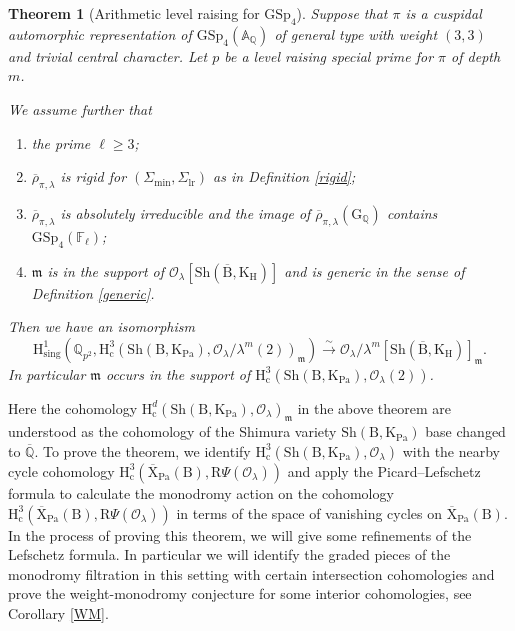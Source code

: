 \documentclass[10pt]{amsart}
\numberwithin{equation}{section}
\newtheorem{theorem}[equation]{Theorem}
\theoremstyle{definition}
\def\GSp{\mathrm{GSp}}
\def\min{\mathrm{min}}
\def\lr{\mathrm{lr}}
\def\Pa{\mathrm{Pa}}
\def\sing{\mathrm{sing}}
\def\calO{\mathcal{O}}
\def\fracm{\mathfrak{m}}
\def\FF{\mathbb{F}}
\def\QQ{\mathbb{Q}}
\def\rmc{\mathrm{c}}
\def\rmB{\mathrm{B}}
\def\rmG{\mathrm{G}}
\def\rmH{\mathrm{H}}
\def\rmK{\mathrm{K}}
\def\rmR{\mathrm{R}}
\def\rmX{\mathrm{X}}
\def\Sh{\mathrm{Sh}}
\begin{document}
\begin{theorem}[Arithmetic level raising for $\GSp_{4}$]\label{intro-main}
Suppose that $\pi$ is a cuspidal automorphic representation of $\GSp_{4}(\mathbb{A}_{\QQ})$ of general type with weight $(3,3)$ and trivial central character. 
Let $p$ be a level raising special prime for $\pi$ of depth $m$. 

We assume further that
\begin{enumerate}
\item the prime $\ell\geq 3$;
\item $\overline{\rho}_{\pi,\lambda}$ is rigid for $(\Sigma_{\min}, \Sigma_{\lr})$ as in Definition \ref{rigid};
\item $\overline{\rho}_{\pi,\lambda}$ is absolutely irreducible and the image of $\overline{\rho}_{\pi,\lambda}(\rmG_{\QQ})$ contains $\GSp_{4}(\FF_{\ell})$;
\item $\fracm$ is in the support of $\calO_{\lambda}[\Sh(\overline{\rmB}, \rmK_{\rmH})]$ and is generic in the sense of Definition \ref{generic}.
\end{enumerate}
Then we have an isomorphism
\begin{equation*}
\rmH^{1}_{\sing}(\QQ_{p^{2}}, \rmH^{3}_{\rmc}(\Sh(\rmB, \rmK_{\Pa}), \calO_{\lambda}/\lambda^{m}(2))_{\fracm})\xrightarrow{\sim}\calO_{\lambda}/\lambda^{m}[\Sh(\overline{\rmB}, \rmK_{\rmH})]_{\fracm}.
\end{equation*}
In particular $\fracm$ occurs in the support of $\rmH^{3}_{\rmc}(\Sh(\rmB, \rmK_{\Pa}), \calO_{\lambda}(2))$. 
\end{theorem}
Here the cohomology $\rmH^{d}_{\rmc}(\Sh(\rmB, \rmK_{\Pa}), \calO_{\lambda})_{\fracm}$ in the above theorem are understood as the cohomology of the Shimura variety $\Sh(\rmB, \rmK_{\Pa})$ base changed to $\overline{\QQ}$.  To prove the theorem, we identify $\rmH^{3}_{\rmc}(\Sh(\rmB, \rmK_{\Pa}), \calO_{\lambda})$ with the nearby cycle cohomology $\rmH^{3}_{\rmc}(\overline{\rmX}_{\Pa}(\rmB), \rmR\Psi(\calO_{\lambda}))$  and apply the Picard--Lefschetz formula to calculate the monodromy action on the cohomology $\rmH^{3}_{\rmc}(\overline{\rmX}_{\Pa}(\rmB), \rmR\Psi(\calO_{\lambda}))$ in terms of the space of vanishing cycles on $\overline{\rmX}_{\Pa}(\rmB)$. In the process of proving this theorem, we will give some refinements of the Lefschetz formula. In particular we will identify the graded pieces of the monodromy filtration in this setting with certain intersection cohomologies and prove the weight-monodromy conjecture for some interior cohomologies, see Corollary \ref{WM}.
\end{document}
